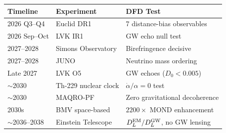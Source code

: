 \documentclass[11pt,a4paper]{article}
\begin{document}
\begin{center}
\begin{tabular}{llp{5cm}}
\toprule
\textbf{Timeline} & \textbf{Experiment} & \textbf{DFD Test} \\
\midrule
2026 Q3--Q4 & Euclid DR1 & 7 distance-bias observables \\
2026 Sep--Oct & LVK IR1 & GW echo null test \\
2027--2028 & Simons Observatory & Birefringence decisive \\
2027--2028 & JUNO & Neutrino mass ordering \\
Late 2027 & LVK O5 & GW echoes ($D_0 < 0.005$) \\
$\sim$2030 & Th-229 nuclear clock & $\dot\alpha/\alpha = 0$ test \\
$\sim$2030 & MAQRO-PF & Zero gravitational decoherence \\
2030s & BMV space-based & $2200\times$ MOND enhancement \\
$\sim$2036--2038 & Einstein Telescope & $D_L^{\rm EM}/D_L^{\rm GW}$, no GW lensing \\
\bottomrule
\end{tabular}
\end{center}
\end{document}

